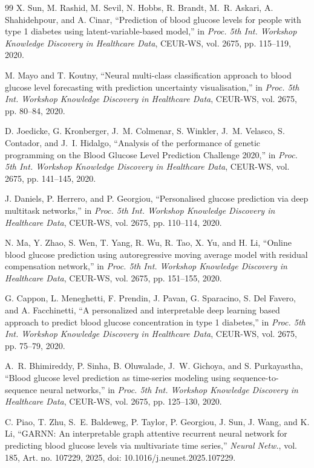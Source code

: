 \documentclass[journal]{IEEEtran}
\begin{document}
\begin{thebibliography}{99}
\label{ref68label} X. Sun, M. Rashid, M. Sevil, N. Hobbs, R. Brandt, M.~R. Askari, A. Shahidehpour, and A. Cinar, ``Prediction of blood glucose levels for people with type 1 diabetes using latent-variable-based model,'' in \emph{Proc. 5th Int. Workshop Knowledge Discovery in Healthcare Data}, CEUR-WS, vol. 2675, pp. 115--119, 2020.

\label{ref69label} M. Mayo and T. Koutny, ``Neural multi-class classification approach to blood glucose level forecasting with prediction uncertainty visualisation,'' in \emph{Proc. 5th Int. Workshop Knowledge Discovery in Healthcare Data}, CEUR-WS, vol. 2675, pp. 80--84, 2020.

\label{ref70label} D. Joedicke, G. Kronberger, J.~M. Colmenar, S. Winkler, J.~M. Velasco, S. Contador, and J.~I. Hidalgo, ``Analysis of the performance of genetic programming on the Blood Glucose Level Prediction Challenge 2020,'' in \emph{Proc. 5th Int. Workshop Knowledge Discovery in Healthcare Data}, CEUR-WS, vol. 2675, pp. 141--145, 2020.

\label{ref71label} J. Daniels, P. Herrero, and P. Georgiou, ``Personalised glucose prediction via deep multitask networks,'' in \emph{Proc. 5th Int. Workshop Knowledge Discovery in Healthcare Data}, CEUR-WS, vol. 2675, pp. 110--114, 2020.

\label{ref72label} N. Ma, Y. Zhao, S. Wen, T. Yang, R. Wu, R. Tao, X. Yu, and H. Li, ``Online blood glucose prediction using autoregressive moving average model with residual compensation network,'' in \emph{Proc. 5th Int. Workshop Knowledge Discovery in Healthcare Data}, CEUR-WS, vol. 2675, pp. 151--155, 2020.

\label{ref73label} G. Cappon, L. Meneghetti, F. Prendin, J. Pavan, G. Sparacino, S. Del Favero, and A. Facchinetti, ``A personalized and interpretable deep learning based approach to predict blood glucose concentration in type 1 diabetes,'' in \emph{Proc. 5th Int. Workshop Knowledge Discovery in Healthcare Data}, CEUR-WS, vol. 2675, pp. 75--79, 2020.

\label{ref74label} A.~R. Bhimireddy, P. Sinha, B. Oluwalade, J.~W. Gichoya, and S. Purkayastha, ``Blood glucose level prediction as time-series modeling using sequence-to-sequence neural networks,'' in \emph{Proc. 5th Int. Workshop Knowledge Discovery in Healthcare Data}, CEUR-WS, vol. 2675, pp. 125--130, 2020.

\label{ref75label} C. Piao, T. Zhu, S.~E. Baldeweg, P. Taylor, P. Georgiou, J. Sun, J. Wang, and K. Li, ``GARNN: An interpretable graph attentive recurrent neural network for predicting blood glucose levels via multivariate time series,'' \emph{Neural Netw.}, vol. 185, Art. no. 107229, 2025, doi: 10.1016/j.neunet.2025.107229.


\end{thebibliography}
\end{document}
